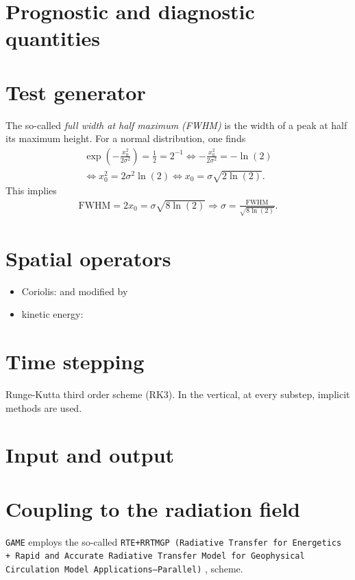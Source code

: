\documentclass[10pt]{report}
\begin{document}
\chapter{Prognostic and diagnostic quantities}
\label{sec:prognostic_and_diagnostic_quantities}

\chapter{Test generator}
\label{sec:test_generator}

The so-called \textit{full width at half maximum (FWHM)} is the width of a peak at half its maximum height. For a normal distribution, one finds
%
\begin{align}
\exp\left(-\frac{x_0^2}{2\sigma^2}\right) = \frac{1}{2} = 2^{-1}\Leftrightarrow -\frac{x_0^2}{2\sigma^2} = -\ln\left(2\right)\nonumber\\
\Leftrightarrow x_0^2 = 2\sigma^2\ln\left(2\right)\Leftrightarrow x_0 = \sigma\sqrt{2\ln\left(2\right)}.
\end{align}
%
This implies
%
\begin{align}
\text{FWHM} = 2x_0 = \sigma\sqrt{8\ln\left(2\right)} \Rightarrow \sigma = \frac{\text{FWHM}}{\sqrt{8\ln\left(2\right)}}.
\end{align}

\chapter{Spatial operators}
\label{sec:spatial_operators}

\begin{itemize}
\item Coriolis: \cite{thuburn_f_discrete_plane} and \cite{ringler_trsk} modified by \cite{doi:10.1002/qj.3294}
\item kinetic energy: \cite{doi:10.1002/qj.1960}
\end{itemize}

\chapter{Time stepping}
\label{sec:time_stepping}

Runge-Kutta third order scheme (RK3). In the vertical, at every substep, implicit methods are used.

\chapter{Input and output}
\label{sec:input_and_output}

\chapter{Coupling to the radiation field}
\label{chap:coupling_to_the_radiation_field}

\texttt{GAME} employs the so-called \texttt{RTE+RRTMGP (Radiative Transfer for Energetics + Rapid and Accurate Radiative Transfer Model for Geophysical Circulation Model Applications—Parallel)} \cite{doi:10.1029/2019MS001621}, \cite{rte-rrtmgp-github} scheme.

\appendix

\printbibliography
\end{document}
